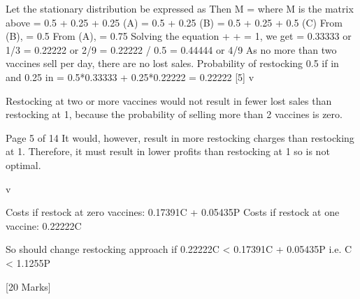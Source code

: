 Let the stationary distribution be expressed as \lambda
Then \lambda M = \lambda where M is the matrix above
 = 0.5  + 0.25  + 0.25  (A) 
 = 0.5  + 0.25  (B) 
 = 0.5  + 0.25  + 0.5  (C) 
From (B),  = 0.5 
From (A),  = 0.75 
Solving the equation  +  +  = 1, we get
 = 0.33333 or 1/3 
 = 0.22222 or 2/9 
 = 0.22222 / 0.5 = 0.44444 or 4/9 
As no more than two vaccines sell per day, there are no lost sales.
Probability of restocking 0.5 if in  and 0.25 in  = 0.5*0.33333 + 0.25*0.22222 = 0.22222 
[5]
v\item 
Restocking at two or more vaccines would not result in fewer lost sales than restocking at 1, because the probability of selling more than 2 vaccines is zero.

Page 5 of 14
It would, however, result in more restocking charges than restocking at 1.
Therefore, it must result in lower profits than restocking at 1 so is not optimal. 

v\item  
Costs if restock at zero vaccines: 0.17391C + 0.05435P 
Costs if restock at one vaccine: 0.22222C

So should change restocking approach if 0.22222C < 0.17391C + 0.05435P
i.e. C < 1.1255P


[20 Marks]

